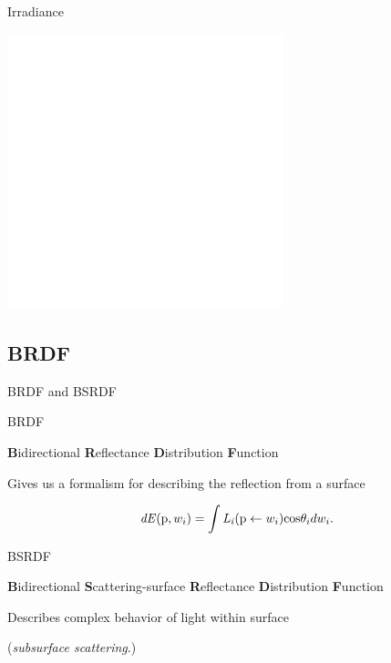 \documentclass[10pt,handout,compress,professionalfont]{beamer}
\begin{document}
\begin{frame}{Irradiance}

    \centering
    \vspace{-1cm}
    \includegraphics[height=80mm]{../img/diag/radiance.pdf}

\end{frame}




\subsection{BRDF}
\begin{frame}{BRDF and BSRDF}


    \begin{block}{BRDF}
        \begin{center}
            {\bf B}idirectional {\bf R}eflectance {\bf D}istribution {\bf F}unction

            \vspace{3mm}

            Gives us a formalism for describing the reflection from a surface
        \end{center}

        \[
            \mathit{dE}(\textup{p}, w_i) = \int\mathit{L_i}(\textup{p} \leftarrow w_i)\textup{cos}\theta_i dw_i.
        \]
    \end{block}
    
    \begin{block}{BSRDF}
        \begin{center}
            {\bf B}idirectional {\bf S}cattering-surface {\bf R}eflectance {\bf D}istribution {\bf F}unction

            \vspace{3mm}

            Describes complex behavior of light within surface

            (\emph{subsurface scattering}.)
        \end{center}
    \end{block}

\end{frame}
\end{document}
